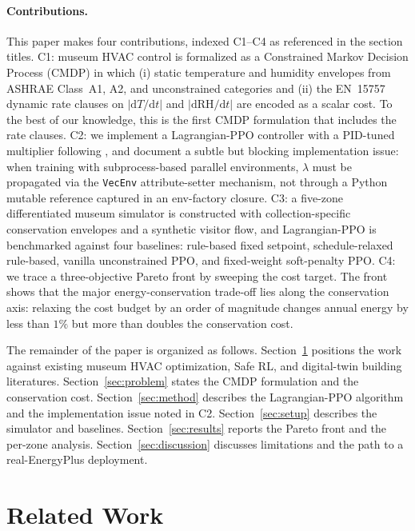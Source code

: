 \documentclass[11pt,a4paper]{article}
\begin{document}
\paragraph{Contributions.}
This paper makes four contributions, indexed C1--C4 as referenced in the
section titles. C1: museum HVAC control is formalized as a Constrained
Markov Decision Process (CMDP) in which (i) static temperature and
humidity envelopes from ASHRAE Class~A1, A2, and unconstrained categories
and (ii) the EN~15757 dynamic rate clauses on
$|\mathrm{d}T/\mathrm{d}t|$ and $|\mathrm{d}\mathrm{RH}/\mathrm{d}t|$
are encoded as a scalar cost. To the best of our knowledge, this is the
first CMDP formulation that includes the rate clauses. C2: we implement
a Lagrangian-PPO controller with a PID-tuned multiplier following
\citet{stooke2020responsive}, and document a subtle but blocking
implementation issue: when training with subprocess-based parallel
environments, $\lambda$ must be propagated via the \texttt{VecEnv}
attribute-setter mechanism, not through a Python mutable reference
captured in an env-factory closure. C3: a five-zone differentiated museum
simulator is constructed with collection-specific conservation envelopes
and a synthetic visitor flow, and Lagrangian-PPO is benchmarked against
four baselines: rule-based fixed setpoint, schedule-relaxed rule-based,
vanilla unconstrained PPO, and fixed-weight soft-penalty PPO. C4: we
trace a three-objective Pareto front by sweeping the cost target. The
front shows that the major energy-conservation trade-off lies along the
conservation axis: relaxing the cost budget by an order of magnitude
changes annual energy by less than $1\%$ but more than doubles the
conservation cost.

The remainder of the paper is organized as follows.
Section~\ref{sec:related} positions the work against existing museum
HVAC optimization, Safe RL, and digital-twin building literatures.
Section~\ref{sec:problem} states the CMDP formulation and the
conservation cost. Section~\ref{sec:method} describes the Lagrangian-PPO
algorithm and the implementation issue noted in C2.
Section~\ref{sec:setup} describes the simulator and baselines.
Section~\ref{sec:results} reports the Pareto front and the per-zone
analysis. Section~\ref{sec:discussion} discusses limitations and the
path to a real-EnergyPlus deployment.

\section{Related Work}\label{sec:related}
\end{document}
